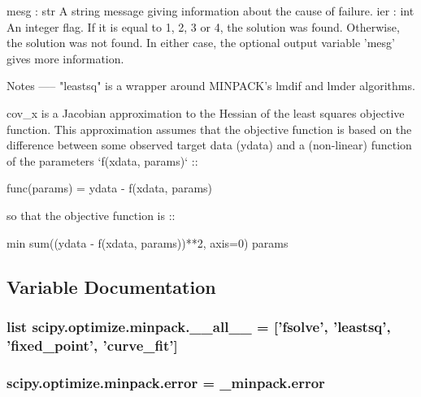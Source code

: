 \begin{DoxyVerb}
mesg : str
    A string message giving information about the cause of failure.
ier : int
    An integer flag.  If it is equal to 1, 2, 3 or 4, the solution was
    found.  Otherwise, the solution was not found. In either case, the
    optional output variable 'mesg' gives more information.

Notes
-----
"leastsq" is a wrapper around MINPACK's lmdif and lmder algorithms.

cov_x is a Jacobian approximation to the Hessian of the least squares
objective function.
This approximation assumes that the objective function is based on the
difference between some observed target data (ydata) and a (non-linear)
function of the parameters `f(xdata, params)` ::

       func(params) = ydata - f(xdata, params)

so that the objective function is ::

       min   sum((ydata - f(xdata, params))**2, axis=0)
     params\end{DoxyVerb}
 

\subsection{Variable Documentation}
\hypertarget{namespacescipy_1_1optimize_1_1minpack_aa93b4148ea95eb00585881c3bab37888}{}
\subsubsection[{\+\_\+\+\_\+all\+\_\+\+\_\+}]{\setlength{\rightskip}{0pt plus 5cm}list scipy.\+optimize.\+minpack.\+\_\+\+\_\+all\+\_\+\+\_\+ = \mbox{[}'{\bf fsolve}', '{\bf leastsq}', '{\bf fixed\+\_\+point}', '{\bf curve\+\_\+fit}'\mbox{]}}\label{namespacescipy_1_1optimize_1_1minpack_aa93b4148ea95eb00585881c3bab37888}
\hypertarget{namespacescipy_1_1optimize_1_1minpack_a2e3b2c63236fc8b37929ddbd17b69d7e}{}
\subsubsection[{error}]{\setlength{\rightskip}{0pt plus 5cm}scipy.\+optimize.\+minpack.\+error = \+\_\+minpack.\+error}\label{namespacescipy_1_1optimize_1_1minpack_a2e3b2c63236fc8b37929ddbd17b69d7e}

